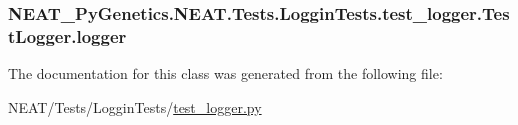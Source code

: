 \subsubsection[{\texorpdfstring{logger}{logger}}]{\setlength{\rightskip}{0pt plus 5cm}N\+E\+A\+T\+\_\+\+Py\+Genetics.\+N\+E\+A\+T.\+Tests.\+Loggin\+Tests.\+test\+\_\+logger.\+Test\+Logger.\+logger}\hypertarget{classNEAT__PyGenetics_1_1NEAT_1_1Tests_1_1LogginTests_1_1test__logger_1_1TestLogger_acaa9869276882a1e8f820a766f5336e9}{}\label{classNEAT__PyGenetics_1_1NEAT_1_1Tests_1_1LogginTests_1_1test__logger_1_1TestLogger_acaa9869276882a1e8f820a766f5336e9}


The documentation for this class was generated from the following file\+:\begin{DoxyCompactItemize}
\item 
N\+E\+A\+T/\+Tests/\+Loggin\+Tests/\hyperlink{test__logger_8py}{test\+\_\+logger.\+py}\end{DoxyCompactItemize}
